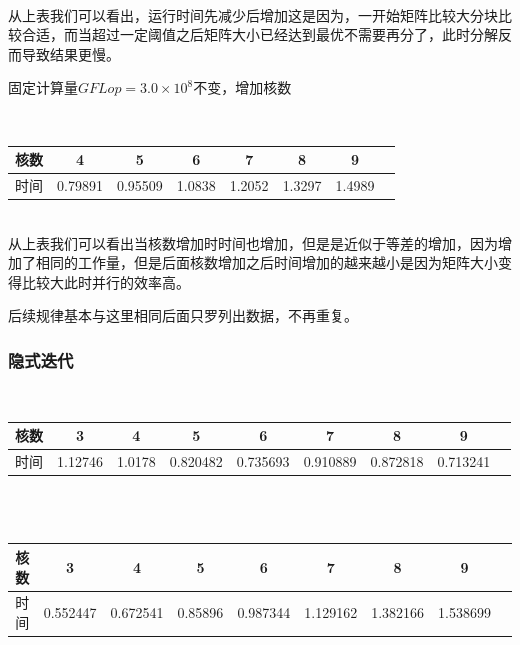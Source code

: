 \documentclass[10pt, a4paper]{article}
\begin{document}
~\\

从上表我们可以看出，运行时间先减少后增加这是因为，一开始矩阵比较大分块比较合适，而当超过一定阈值之后矩阵大小已经达到最优不需要再分了，此时分解反而导致结果更慢。

固定计算量$GFLop = 3.0\times 10^8$不变，增加核数

~\\

\begin{tabular}{|c|c|c|c|c|c|c|c|}%
\hline  %
核数&4&5&6&7&8&9\\
\hline  %
时间&0.79891&0.95509&1.0838&1.2052&1.3297&1.4989\\
\hline %
\end{tabular}

~\\

从上表我们可以看出当核数增加时时间也增加，但是是近似于等差的增加，因为增加了相同的工作量，但是后面核数增加之后时间增加的越来越小是因为矩阵大小变得比较大此时并行的效率高。

后续规律基本与这里相同后面只罗列出数据，不再重复。

\subsubsection{隐式迭代}

~\\

\begin{tabular}{|c|c|c|c|c|c|c|c|c|}%
\hline  %
核数&3&4&5&6&7&8&9\\
\hline  %
时间&1.12746&1.0178&0.820482&0.735693&0.910889&0.872818&0.713241\\
\hline %
\end{tabular}

~\\

~\\



\begin{tabular}{|c|c|c|c|c|c|c|c|c|}%
\hline  %
核数&3&4&5&6&7&8&9\\
\hline  %
时间&0.552447&0.672541&0.85896&0.987344&1.129162&1.382166&1.538699\\
\hline %
\end{tabular}
\end{document}
